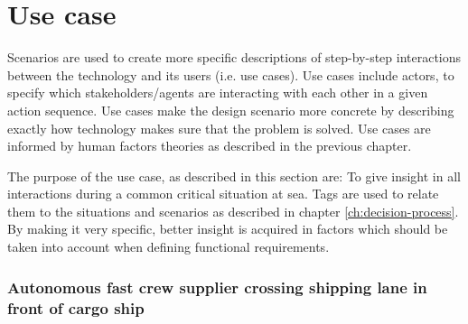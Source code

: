 \section{Use case}
\label{sec:use-case}
Scenarios are used to create more specific descriptions of step-by-step interactions between the technology and its users (i.e. use cases). Use cases include actors, to specify which stakeholders/agents are interacting with each other in a given action sequence.
Use cases make the design scenario more concrete by describing exactly how technology makes sure that the problem is solved. Use cases are informed by human factors theories as described in the previous chapter.


The purpose of the use case, as described in this section are: To give insight in all interactions during a common critical situation at sea. Tags are used to relate them to the situations and scenarios as described in chapter \ref{ch:decision-process}. By making it very specific, better insight is acquired in factors which should be taken into account when defining functional requirements. 

\subsubsection{Autonomous fast crew supplier crossing shipping lane in front of cargo ship}

